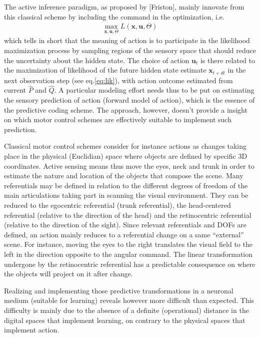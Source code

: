 \documentclass[11pt]{article}
\begin{document}
The active inference paradigm, as proposed by [Friston], mainly innovate from this classical scheme by including the command in the optimization, i.e. 
\begin{align}
\max_{\boldsymbol{x},\boldsymbol{u},\Theta} L(\boldsymbol{x},\boldsymbol{u},\Theta)
\end{align}
which tells in short that the meaning of action is to participate in the likelihood maximization process by sampling regions of the sensory space that should reduce the uncertainty about the hidden state. The choice of action $\boldsymbol{u}_t$ is there related to the maximization of likelihood of the future hidden state estimate $\boldsymbol{x}_{t+dt}$ in the next observation step (see eq.\ref{eq:lik}), with action outcome estimated from current $\hat{P}$ and $\hat{Q}$. A particular modeling effort needs thus to be put on estimating the sensory prediction of action (forward model of action), which is the essence of the predictive coding scheme.  
The approach, however, doesn't provide a insight on which motor control schemes are effectively suitable to implement such prediction.   

Classical motor control schemes consider for instance actions as changes taking place in the physical (Euclidian) space where objects are defined by specific 3D coordinates. Active sensing means thus move the eyes, neck and trunk in order to estimate the nature and location of the objects that compose the scene.  
Many referentials may be defined in relation to the different degrees of freedom of the main articulations taking part in scanning the visual environment. They can be reduced to the egocentric referential (trunk referential), the head-centered referential (relative to the direction of the head) and the retinocentric referential (relative to the direction of the sight). Since relevant referentials and DOFs are defined, an action mainly reduces to a referential change on a same ``external'' scene. For instance, moving the eyes to the right translates the visual field to the left in the direction opposite to the angular command. The  linear transformation undergone by the retinocentric referential has a predictable consequence on where the objects will project on it after change. 

Realizing and implementing those predictive transformations in a neuronal medium (suitable for learning) reveals however more difficult than expected. This difficulty is mainly due to the absence of a definite (operational) distance in the digital spaces that implement learning, on contrary to the physical spaces that implement action.  
\end{document}
